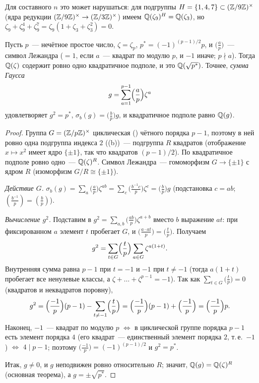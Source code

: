 Для составного $n$ это может нарушаться: для подгруппы $H=\{1,4,7\}\subset(\mathbb Z/9\mathbb Z)^\times$ (ядра редукции
$(\mathbb Z/9\mathbb Z)^\times\to(\mathbb Z/3\mathbb Z)^\times$) имеем $\mathbb Q(\zeta_9)^H=\mathbb Q(\zeta_3)$, но $\zeta_9+\zeta_9^4+\zeta_9^7=\zeta_9(1+\zeta_3+\zeta_3^2)=0$.

\begin{theorem}
Пусть $p$~--- нечётное простое число, $\zeta=\zeta_p$, $p^*=(-1)^{(p-1)/2}p$, и $\bigl(\frac ap\bigr)$~--- символ Лежандра
($=1$, если $a$~--- квадрат по модулю $p$, и $-1$ иначе; $p\nmid a$). Тогда $\mathbb Q(\zeta)$ содержит ровно одно квадратичное
подполе, и это $\mathbb Q(\sqrt{p^*})$. Точнее, \emph{сумма Гаусса}
\[
g=\sum_{a=1}^{p-1}\Bigl(\frac ap\Bigr)\zeta^a
\]
удовлетворяет $g^2=p^*$, $\sigma_b(g)=\bigl(\frac bp\bigr)g$, и квадратичное подполе равно $\mathbb Q(g)$.
\end{theorem}

\begin{proof}
Группа $G=(\mathbb Z/p\mathbb Z)^\times$ циклическая () чётного порядка $p-1$, поэтому в ней ровно одна подгруппа индекса $2$
((b))~--- подгруппа $R$ квадратов (отображение $x\mapsto x^2$ имеет ядро $\{\pm1\}$, так что квадратов $(p-1)/2$). По
 квадратичное подполе ровно одно~--- $\mathbb Q(\zeta)^R$. Символ Лежандра~--- гомоморфизм $G\to\{\pm1\}$ с ядром $R$
(изоморфизм $G/R\cong\{\pm1\}$).

\emph{Действие $G$.} $\sigma_b(g)=\sum_a\bigl(\frac ap\bigr)\zeta^{ab}=\sum_c\bigl(\frac{b^{-1}c}p\bigr)\zeta^c=\bigl(\frac bp\bigr)g$
(подстановка $c=ab$; $(\frac{b^{-1}}p)=(\frac bp)$).

\emph{Вычисление $g^2$.} Подставим в $g^2=\sum_{a,b}\bigl(\frac{ab}p\bigr)\zeta^{a+b}$ вместо $b$ выражение $at$: при
фиксированном $a$ элемент $t$ пробегает $G$, и $\bigl(\frac{a\cdot at}p\bigr)=\bigl(\frac tp\bigr)$. Получаем
\[
g^2=\sum_{t\in G}\Bigl(\frac tp\Bigr)\sum_{a\in G}\zeta^{a(1+t)} .
\]
Внутренняя сумма равна $p-1$ при $t=-1$ и $-1$ при $t\ne-1$ (тогда $a(1+t)$ пробегает все ненулевые классы, а
$\zeta+\dots+\zeta^{p-1}=-1$). Так как $\sum_{t\in G}\bigl(\frac tp\bigr)=0$ (квадратов и неквадратов поровну),
\[
g^2=\Bigl(\frac{-1}p\Bigr)(p-1)-\sum_{t\ne-1}\Bigl(\frac tp\Bigr)=\Bigl(\frac{-1}p\Bigr)(p-1)+\Bigl(\frac{-1}p\Bigr)=\Bigl(\frac{-1}p\Bigr)p .
\]
Наконец, $-1$~--- квадрат по модулю $p$ $\iff$ в циклической группе порядка $p-1$ есть элемент порядка $4$ (его квадрат~---
единственный элемент порядка $2$, т.\,е.\ $-1$) $\iff$ $4\mid p-1$; поэтому $\bigl(\frac{-1}p\bigr)=(-1)^{(p-1)/2}$ и $g^2=p^*$.

Итак, $g\ne0$, и $g$ неподвижен ровно относительно $R$; значит, $\mathbb Q(g)=\mathbb Q(\zeta)^R$ (основная теорема), а $g=\pm\sqrt{p^*}$.
\end{proof}

